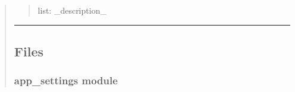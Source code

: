 \documentclass[letterpaper,10pt,english]{sphinxmanual}
\begin{document}
\begin{quote}
\begin{savenotes}
\begin{fulllineitems}
\begin{savenotes}
\begin{fulllineitems}
\begin{quote}
\begin{description}
\sphinxAtStartPar
list: \_description\_

\end{description}\end{quote}

\end{fulllineitems}\end{savenotes}


\begin{savenotes}\begin{fulllineitems}
\label{\detokenize{setting/utils/move_on_list:oxin.utils.move_on_list.moveOnList.next_on_list}}
\pysigstartsignatures
{}
\pysigstopsignatures
\end{fulllineitems}\end{savenotes}


\begin{savenotes}\begin{fulllineitems}
\label{\detokenize{setting/utils/move_on_list:oxin.utils.move_on_list.moveOnList.prev_on_list}}
\pysigstartsignatures
{}
\pysigstopsignatures
\end{fulllineitems}\end{savenotes}


\end{fulllineitems}\end{savenotes}



\bigskip\hrule\bigskip



\subsection{Files}
\label{\detokenize{Setting Software:files}}
\sphinxstepscope


\subsubsection{app\_settings module}
\label{\detokenize{setting/app_settings:module-oxin.app_settings}}\label{\detokenize{setting/app_settings:app-settings-module}}\label{\detokenize{setting/app_settings::doc}}


\end{quote}
\end{document}
